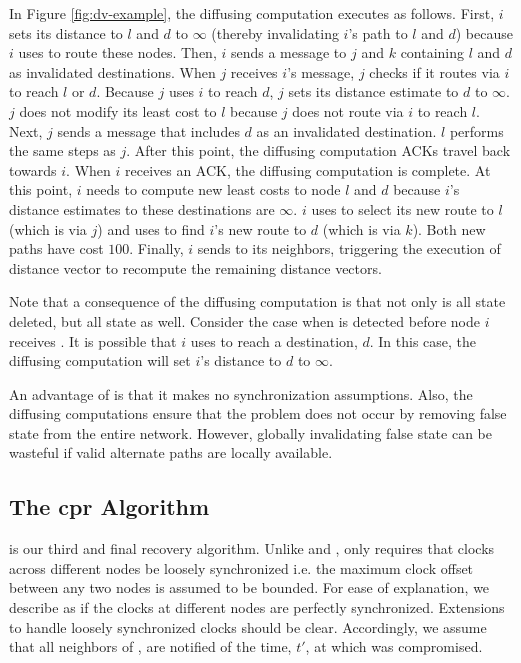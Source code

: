
In Figure \ref{fig:dv-example}, the diffusing computation executes as follows. First, $i$ sets its distance to $l$ and $d$ to $\infty$ (thereby invalidating $i$'s path to $l$ and $d$)
because $i$ uses \bad to route these nodes. Then, $i$ sends a message to $j$ and $k$ containing $l$ and $d$ as invalidated destinations.
When $j$ receives $i$'s message, $j$ checks if it routes via $i$ to reach $l$ or $d$. Because $j$ uses $i$ to reach $d$, $j$ sets its distance estimate to $d$ to $\infty$. 
$j$ does not modify its least cost to $l$ because $j$ does not route via $i$ to reach $l$. Next, $j$ sends a message that includes $d$ as an invalidated destination.
$l$ performs the same steps as $j$. After this point, the diffusing computation ACKs travel back towards $i$. When $i$ receives an ACK, the diffusing computation is complete. At this
point, $i$ needs to compute new least costs to node $l$ and $d$ because $i$'s distance estimates to these destinations are $\infty$. 
$i$ uses \dmatrixi to select its new route to $l$ (which is via $j$) and uses \dmatrixi to find $i$'s new route to $d$ (which is via $k$). Both new paths have cost $100$. Finally,
$i$ sends \minvi to its neighbors, triggering the execution of distance vector to recompute the remaining distance vectors.

Note that a consequence of the diffusing computation is that not only is all \badvector state deleted, but all \oldvector state as well.  
Consider the case when \bad is detected before node $i$ receives \badvectors.
It is possible that $i$ uses \oldvector to reach a destination, $d$. In this case, the diffusing computation will set $i$'s distance to $d$ to $\infty$.

An advantage of \purge is that it makes no synchronization assumptions. Also, the diffusing computations ensure that the \infinity problem does not occur by removing
false state from the entire network. However, globally invalidating false state can be wasteful if valid alternate paths are locally available. 


\subsection{The cpr Algorithm}
\label{subsec:cpr}

is our third and final recovery algorithm. 
Unlike \second and \purges, \cpr only requires that clocks across different
nodes be loosely synchronized i.e. the maximum clock offset between
any two nodes is assumed to be  bounded. For ease of explanation, we
describe \cpr as if the clocks at different nodes are perfectly
synchronized. Extensions to handle loosely synchronized clocks should
be clear. Accordingly, we assume that all neighbors of \bads, are
notified of the time, $t'$, at which \bad was compromised.

